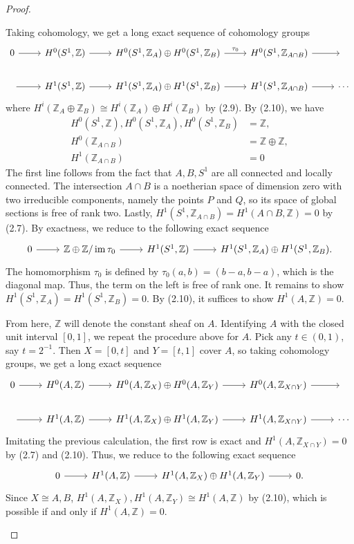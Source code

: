 \documentclass{article}
\newcommand{\Z}{\mathbb{Z}}
\DeclareMathOperator{\im}{im}
\begin{document}
\begin{enumerate} [label=\textbf{\arabic*.}, leftmargin=0em]
\begin{proof}
\begin{itemize} [leftmargin=0cm]
Taking cohomology, we get a long exact sequence of cohomology groups
\[ \begin{tikzcd}
    0 \arrow[r]  & H^0(S^1, \Z) \arrow[r] & H^0(S^1, \Z_A) \oplus H^0(S^1, \Z_B) \arrow[r, "\tau_0"] & H^0(S^1, \Z_{A \cap B}) \arrow[r] & {}     \\
    {} \arrow[r] & H^1(S^1, \Z) \arrow[r] & H^1(S^1, \Z_A) \oplus H^1(S^1, \Z_B) \arrow[r] & H^1(S^1, \Z_{A \cap B}) \arrow[r] & \cdots
    \end{tikzcd} \]
where $H^i(\Z_A \oplus \Z_B) \cong H^i(\Z_A) \oplus H^i(\Z_B)$ by (2.9). By (2.10), we have
\begin{align*}
    H^0(S^1, \Z), H^0(S^1, \Z_A), H^0(S^1, \Z_B) & = \Z, \\
    H^0(\Z_{A \cap B}) & = \Z \oplus \Z, \\
    H^1(\Z_{A \cap B}) & = 0
\end{align*}
The first line follows from the fact that $A, B , S^1$ are all connected and locally connected. The intersection $A \cap B$ is a noetherian space of dimension zero with two irreducible components, namely the points $P$ and $Q$, so its space of global sections is free of rank two. Lastly, $H^1(S^1, \Z_{A \cap B}) = H^1(A \cap B, \Z) = 0$ by (2.7). By exactness, we reduce to the following exact sequence
\[ \begin{tikzcd}
    0 \arrow[r] & \Z \oplus \Z / \im{\tau_0} \arrow[r] & H^1(S^1,\Z) \arrow[r] & H^1(S^1, \Z_A) \oplus H^1(S^1, \Z_B).
    \end{tikzcd} \]
The homomorphism $\tau_0$ is defined by $\tau_0(a, b) = (b - a, b - a)$, which is the diagonal map. Thus, the term on the left is free of rank one. It remains to show $H^1(S^1, \Z_A) = H^1(S^1, \Z_B) = 0$. By (2.10), it suffices to show $H^1(A, \Z) = 0$.

From here, $\Z$ will denote the constant sheaf on $A$. Identifying $A$ with the closed unit interval $[0, 1]$, we repeat the procedure above for $A$. Pick any $t \in (0, 1)$, say $t = 2^{-1}$. Then $X = [0, t]$ and $Y = [t, 1]$ cover $A$, so taking cohomology groups, we get a long exact sequence
\[ \begin{tikzcd}
    0 \arrow[r]  & H^0(A, \Z) \arrow[r] & H^0(A, \Z_X) \oplus H^0(A, \Z_Y) \arrow[r] & H^0(A, \Z_{X \cap Y}) \arrow[r] & {}     \\
    {} \arrow[r] & H^1(A, \Z) \arrow[r] & H^1(A, \Z_X) \oplus H^1(A, \Z_Y) \arrow[r] & H^1(A, \Z_{X \cap Y}) \arrow[r] & \cdots
    \end{tikzcd} \]
Imitating the previous calculation, the first row is exact and $H^1(A, \Z_{X \cap Y}) = 0$ by (2.7) and (2.10). Thus, we reduce to the following exact sequence
\[ \begin{tikzcd}
    0 \arrow[r] & H^1(A, \Z) \arrow[r] & H^1(A,\Z_X) \oplus H^1(A, \Z_Y) \arrow[r] & 0.
    \end{tikzcd} \]
Since $X \cong A, B$, $H^1(A, \Z_X), H^1(A, \Z_Y) \cong H^1(A, \Z)$ by (2.10), which is possible if and only if $H^1(A, \Z) = 0$.


\end{itemize}
\end{proof}
\end{enumerate}
\end{document}
